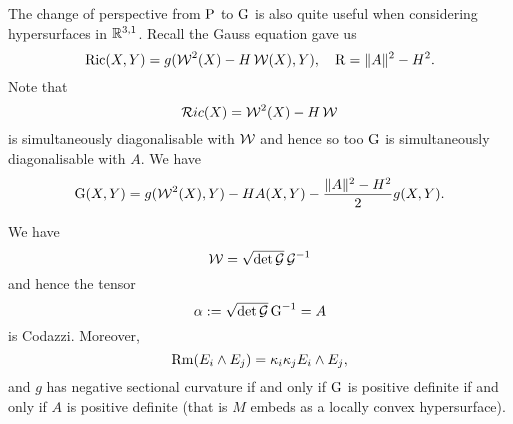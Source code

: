 \documentclass[a4paper, 12pt]{amsart}
\begin{document}
The change of perspective from \(\operatorname{P}\) to \(\operatorname{G}\) is also quite useful when considering hypersurfaces in \(\mathbb{R}^{3,1}\). Recall the Gauss equation gave us
\[
\operatorname{Ric}(X, Y) = g(\operatorname{\mathcal{W}}^2(X) - H \operatorname{\mathcal{W}}(X), Y), \quad \operatorname{R} = \|A\|^2 - H^2.
\]
Note that
\[
\mathcal{R}ic (X) = \operatorname{\mathcal{W}}^2(X) - H \operatorname{\mathcal{W}}
\]
is simultaneously diagonalisable with \(\operatorname{\mathcal{W}}\) and hence so too \(\operatorname{G}\) is simultaneously diagonalisable with \(A\). We have
\begin{equation}
\label{eq:ein_extrinsic}
\operatorname{G} (X, Y) = g(\operatorname{\mathcal{W}}^2(X), Y) - H A(X, Y) - \frac{\|A\|^2 - H^2}{2} g (X, Y).
\end{equation}

\begin{lemma}
\label{lem:ein_W}

We have
\[
\operatorname{\mathcal{W}} = \sqrt{\det \operatorname{\mathcal{G}}} \operatorname{\mathcal{G}}^{-1}
\]
and hence the tensor
\[
\alpha := \sqrt{\det \operatorname{\mathcal{G}}} \operatorname{G}^{-1} = A
\]
is Codazzi. Moreover,
\[
\operatorname{Rm} (E_i \wedge E_j) = \kappa_i \kappa_j E_i \wedge E_j,
\]
and \(g\) has negative sectional curvature if and only if \(\operatorname{G}\) is positive definite if and only if \(A\) is positive definite (that is \(M\) embeds as a locally convex hypersurface).
\end{lemma}
\end{document}
